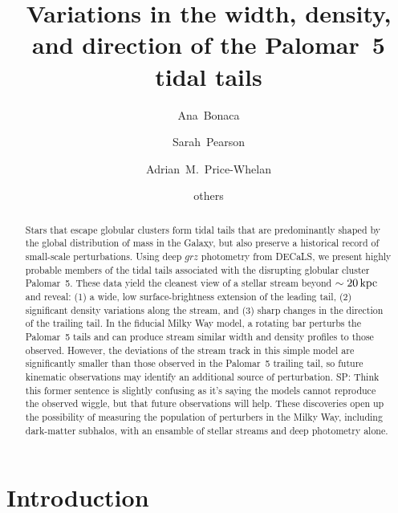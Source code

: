 \documentclass[twocolumn]{aastex62}
\newcommand{\sa}[1]{{\color{magenta} SP: #1}}
\begin{document}
\sloppy\sloppypar\raggedbottom\frenchspacing %

\title{Variations in the width, density, and direction of the Palomar~5 tidal tails}

\author[0000-0002-7846-9787]{Ana~Bonaca}

\author[0000-0003-0256-5446]{Sarah~Pearson}

\author[0000-0003-0872-7098]{Adrian~M.~Price-Whelan}

\author{others}

\begin{abstract}\noindent %
Stars that escape globular clusters form tidal tails that are predominantly shaped by the global distribution of mass in the Galaxy, but also preserve a historical record of small-scale perturbations.
Using deep $grz$ photometry from DECaLS, we present highly probable members of the tidal tails associated with the disrupting globular cluster Palomar~5.
These data yield the cleanest view of a stellar stream beyond $\sim20\,\rm kpc$ and reveal: (1) a wide, low surface-brightness extension of the leading tail, (2) significant density variations along the stream, and (3) sharp changes in the direction of the trailing tail.
In the fiducial Milky Way model, a rotating bar perturbs the Palomar~5 tails and can produce stream similar width and density profiles to those observed.
However, the deviations of the stream track in this simple model are significantly smaller than those observed in the Palomar~5 trailing tail, so future kinematic observations may identify an additional source of perturbation. \sa{Think this former sentence is slightly confusing as it's saying the models cannot reproduce the observed wiggle, but that future observations will help.}
These discoveries open up the possibility of measuring the population of perturbers in the Milky Way, including dark-matter subhalos, with an ensamble of stellar streams and deep photometry alone.
\end{abstract}


\section{Introduction}
\label{sec:intro}
\end{document}
